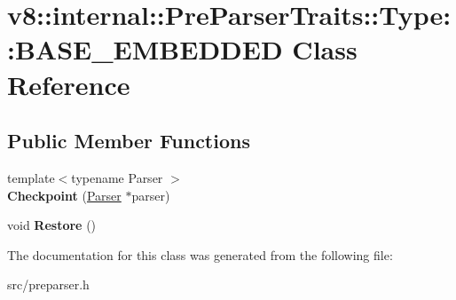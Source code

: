\hypertarget{classv8_1_1internal_1_1_pre_parser_traits_1_1_type_1_1_b_a_s_e___e_m_b_e_d_d_e_d}{}\section{v8\+:\+:internal\+:\+:Pre\+Parser\+Traits\+:\+:Type\+:\+:B\+A\+S\+E\+\_\+\+E\+M\+B\+E\+D\+D\+E\+D Class Reference}
\label{classv8_1_1internal_1_1_pre_parser_traits_1_1_type_1_1_b_a_s_e___e_m_b_e_d_d_e_d}
\subsection*{Public Member Functions}
\begin{DoxyCompactItemize}
\item 
\hypertarget{classv8_1_1internal_1_1_pre_parser_traits_1_1_type_1_1_b_a_s_e___e_m_b_e_d_d_e_d_a12010dcb42c1b9f24a8497e3a2361d39}{}{\footnotesize template$<$typename Parser $>$ }\\{\bfseries Checkpoint} (\hyperlink{classv8_1_1internal_1_1_pre_parser}{Parser} $\ast$parser)\label{classv8_1_1internal_1_1_pre_parser_traits_1_1_type_1_1_b_a_s_e___e_m_b_e_d_d_e_d_a12010dcb42c1b9f24a8497e3a2361d39}

\item 
\hypertarget{classv8_1_1internal_1_1_pre_parser_traits_1_1_type_1_1_b_a_s_e___e_m_b_e_d_d_e_d_af72fc1eb4b2c3e50a46fa1474e90861d}{}void {\bfseries Restore} ()\label{classv8_1_1internal_1_1_pre_parser_traits_1_1_type_1_1_b_a_s_e___e_m_b_e_d_d_e_d_af72fc1eb4b2c3e50a46fa1474e90861d}

\end{DoxyCompactItemize}


The documentation for this class was generated from the following file\+:\begin{DoxyCompactItemize}
\item 
src/preparser.\+h\end{DoxyCompactItemize}
